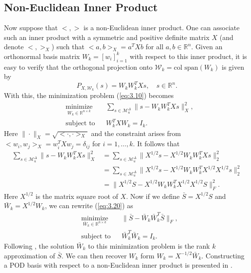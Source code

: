 \subsection{Non-Euclidean Inner Product} \label{sec:3.2.2}
Now suppose that $<,>$ is a non-Euclidean inner product. One can associate such an inner product with a symmetric and positive definite matrix $X$ (and denote $<,>_X$) such that $<a,b>_X = a^TXb$ for all $a,b\in \mathbb R^n$. Given an orthonormal basis matrix $W_k = [w_i]_{i=1}^k$ with respect to this inner product, it is easy to verify that the orthogonal projection onto $\mathcal W_k = \text{col\ span}(W_k)$ is given by
\begin{equation} \label{eq:3.19}
	P_{X,\mathcal W_k}(s) = W_kW_k^TXs, \quad s\in \mathbb R^{n}.
\end{equation}
With this, the minimization problem (\ref{eq:3.10}) becomes
\begin{equation} \label{eq:3.20}
\begin{aligned}
&  \underset{W_k\in\mathbb R^{n\times k}}{\text{minimize}}
& & \sum_{s\in \mathcal M_u^{\Delta}} \| s - W_kW_k^TXs\|^2_X, \\
& \text{subject to}
& & W_k^TXW_k=I_k.
\end{aligned}
\end{equation}
Here $\| \cdot \|_X = \sqrt{<\cdot , \cdot>_X}$ and the constraint arises from $<w_i,w_j>_X = w_i^TXw_j = \delta_{ij}$ for $i=1,\dots,k$. It follows that
\begin{equation} \label{eq:3.21}
\begin{aligned}
	\sum_{s\in \mathcal M_u^{\Delta}} \| s - W_kW_k^TXs\|^2_X &= \sum_{s\in \mathcal M_u^{\Delta}} \| X^{1/2}s - X^{1/2}W_kW_k^TXs\|_2^2 \\
	&= \sum_{s\in \mathcal M_u^{\Delta}} \| X^{1/2}s - X^{1/2}W_kW_k^TX^{1/2} X^{1/2}s\|_2^2 \\
	& = \| X^{1/2}S - X^{1/2}W_kW_k^TX^{1/2} X^{1/2}S \|_F^2.
\end{aligned}
\end{equation}
Here $X^{1/2}$ is the matrix square root of $X$. Now if we define $\bar S = X^{1/2} S$ and $\bar W_k = X^{1/2} W_k$, we can rewrite (\ref{eq:3.20}) as 
\begin{equation} \label{eq:3.22}
\begin{aligned}
&  \underset{\bar W_k\in\mathbb R^{n\times k}}{\text{minimize}}
& & \| \bar S - \bar W_k \bar W_k^T \bar S\|_F, \\
& \text{subject to}
& & \bar W_k^T\bar W_k=I_k.
\end{aligned}
\end{equation}
Following , the solution $\bar W_k$ to this minimization problem is the rank $k$ approximation of $\bar S$. We can then recover $W_k$ form $W_k = X^{-1/2}\bar W_k$. Constructing a POD basis with respect to a non-Euclidean inner product is presented in .

